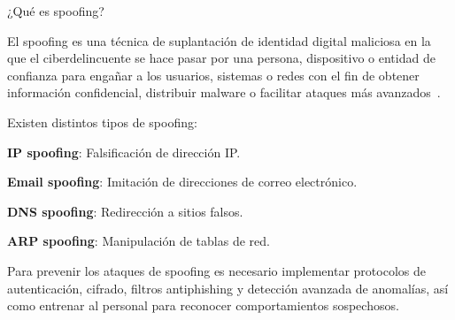 ¿Qué es spoofing?

El spoofing es una técnica de suplantación de identidad digital maliciosa en la que el ciberdelincuente se hace pasar por una persona, dispositivo o entidad de confianza para engañar a los usuarios, sistemas o redes con el fin de obtener información confidencial, distribuir malware o facilitar ataques más avanzados~\cite{spoof}.

Existen distintos tipos de spoofing:
\begin{itemizeColor}
    \item \textbf{IP spoofing}: Falsificación de dirección IP.
    \item \textbf{Email spoofing}: Imitación de direcciones de correo electrónico.
    \item \textbf{DNS spoofing}: Redirección a sitios falsos.
    \item \textbf{ARP spoofing}: Manipulación de tablas de red.
\end{itemizeColor}

Para prevenir los ataques de spoofing es necesario implementar protocolos de autenticación, cifrado, filtros antiphishing y detección avanzada de anomalías, así como entrenar al personal para reconocer comportamientos sospechosos.
